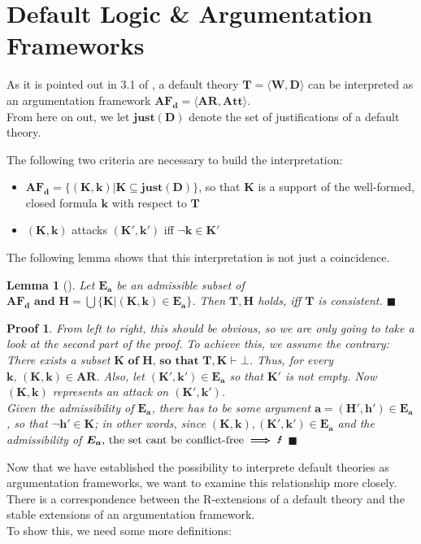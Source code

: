 \documentclass[12pt]{report}
\numberwithin{figure}{chapter}
\theoremstyle{break}
\newtheorem{lem}{Lemma}[chapter]
\newtheorem*{prf}{Proof}
\newenvironment{mylem}{\begin{lem}}{$\blacksquare$ \end{lem}}
\newenvironment{myprf}{\begin{prf}}{$\blacksquare$ \end{prf}}
\begin{document}
\section{Default Logic \& Argumentation Frameworks}
As it is pointed out in 3.1 of \cite{Dung}, a default theory $\bm{T = \langle W,D \rangle}$ can be interpreted as an argumentation framework $\bm{AF_{d} = \langle AR,Att \rangle}$.\\
From here on out, we let $\bm{just(D)}$ denote the set of justifications of a default theory.

The following two criteria are necessary to build the interpretation:
\begin{itemize}
	\item{$\bm{AF_{d} = \{(K,k) \vert K \subseteq just(D)\}}$, so that $\bm{K}$ is a support of the well-formed, closed formula $\bm{k}$ with respect to $\bm{T}$}
	\item{$\bm{(K,k)}$ attacks $\bm{(K',k')}$ iff $\bm{\lnot k \in K'}$}
\end{itemize}

The following lemma shows that this interpretation is not just a coincidence.

\begin{mylem}[\cite{Dung}]
Let $\bm{E_{a}}$ be an admissible subset of $\bm{AF_{d} \text{ and } H = \bigcup \{K \vert (K,k) \in E_{a}\}}$.
Then $\bm{T,H}$ holds, iff $\bm{T}$ is consistent.
\end{mylem}

\begin{myprf}
From left to right, this should be obvious, so we are only going to take a look at the second part of the proof.
To achieve this, we assume the contrary:\\There exists a subset $\bm{K \text{ of } H \text{, so that } T,K \vdash \bot}$.
Thus, for every $\bm{k \text{, }(K,k) \in AR}$. Also, let $\bm{(K',k') \in E_{a}}$ so that $\bm{K'}$ is not empty.
Now $\bm{(K,k)}$ represents an attack on $\bm{(K',k')}$.\\Given the admissibility of $\bm{E_{a}}$, there has to be some argument $\bm{a = (H',h') \in E_{a}}$, so that
$\bm{\lnot h' \in K}$; in other words, since $\bm{(K,k),(K',k') \in E_{a}}$ and the admissibility of $\bm{E_{a} \text{, the set cant be conflict-free} \implies \text{\Lightning}}$ 
\end{myprf}

Now that we have established the possibility to interprete default theories as argumentation frameworks, we want to examine this relationship more closely.
There is a correspondence between the R-extensions of a default theory and the stable extensions of an argumentation framework.\\
To show this, we need some more definitions:
\end{document}
